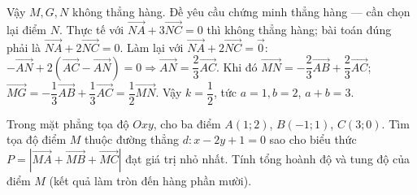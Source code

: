 \begin{bt}
{Vậy $M,G,N$ không thẳng hàng. Đề yêu cầu chứng minh thẳng hàng — cần chọn lại điểm $N$. Thực tế với $\overrightarrow{NA}+3\overrightarrow{NC}=0$ thì không thẳng hàng; bài toán đúng phải là $\overrightarrow{NA}+2\overrightarrow{NC}=0$.
Làm lại với $\overrightarrow{NA}+2\overrightarrow{NC}=\overrightarrow{0}$: $-\overrightarrow{AN}+2(\overrightarrow{AC}-\overrightarrow{AN})=0\Rightarrow\overrightarrow{AN}=\dfrac23\overrightarrow{AC}$.
Khi đó $\overrightarrow{MN}=-\dfrac23\overrightarrow{AB}+\dfrac23\overrightarrow{AC}$; $\overrightarrow{MG}=-\dfrac13\overrightarrow{AB}+\dfrac13\overrightarrow{AC}=\dfrac12\overrightarrow{MN}$. Vậy $k=\dfrac12$, tức $a=1,b=2$, $a+b=3$.
}

\end{bt}

\begin{bt}%
Trong mặt phẳng tọa độ $Oxy$, cho ba điểm $A(1;2)$, $B(-1;1)$, $C(3;0)$. Tìm tọa độ điểm $M$ thuộc đường thẳng $d: x-2y+1=0$ sao cho biểu thức $P=\left|\overrightarrow{MA}+\overrightarrow{MB}+\overrightarrow{MC}\right|$ đạt giá trị nhỏ nhất. Tính tổng hoành độ và tung độ của điểm $M$ (kết quả làm tròn đến hàng phần mười).

\end{bt}

